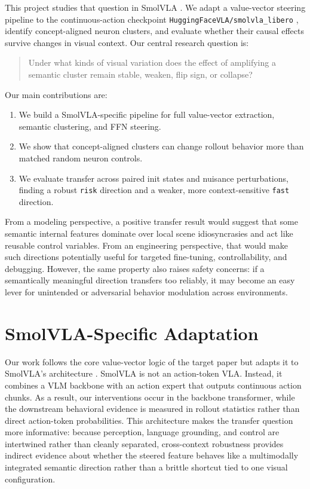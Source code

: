 \documentclass[11pt]{article}
\begin{document}
This project studies that question in SmolVLA \citep{shukor2025smolvla}. We adapt a value-vector steering pipeline to the continuous-action checkpoint \texttt{HuggingFaceVLA/smolvla\_libero} \citep{huggingfacevla2025smolvla_libero}, identify concept-aligned neuron clusters, and evaluate whether their causal effects survive changes in visual context. Our central research question is:

\begin{quote}
Under what kinds of visual variation does the effect of amplifying a semantic cluster remain stable, weaken, flip sign, or collapse?
\end{quote}

Our main contributions are:
\begin{enumerate}
    \item We build a SmolVLA-specific pipeline for full value-vector extraction, semantic clustering, and FFN steering.
    \item We show that concept-aligned clusters can change rollout behavior more than matched random neuron controls.
    \item We evaluate transfer across paired init states and nuisance perturbations, finding a robust \texttt{risk} direction and a weaker, more context-sensitive \texttt{fast} direction.
\end{enumerate}

From a modeling perspective, a positive transfer result would suggest that some semantic internal features dominate over local scene idiosyncrasies and act like reusable control variables. From an engineering perspective, that would make such directions potentially useful for targeted fine-tuning, controllability, and debugging. However, the same property also raises safety concerns: if a semantically meaningful direction transfers too reliably, it may become an easy lever for unintended or adversarial behavior modulation across environments.

\section{SmolVLA-Specific Adaptation}

Our work follows the core value-vector logic of the target paper \citep{haon2025mechanistic} but adapts it to SmolVLA's architecture \citep{shukor2025smolvla}. SmolVLA is not an action-token VLA. Instead, it combines a VLM backbone with an action expert that outputs continuous action chunks. As a result, our interventions occur in the backbone transformer, while the downstream behavioral evidence is measured in rollout statistics rather than direct action-token probabilities. This architecture makes the transfer question more informative: because perception, language grounding, and control are intertwined rather than cleanly separated, cross-context robustness provides indirect evidence about whether the steered feature behaves like a multimodally integrated semantic direction rather than a brittle shortcut tied to one visual configuration.
\end{document}
